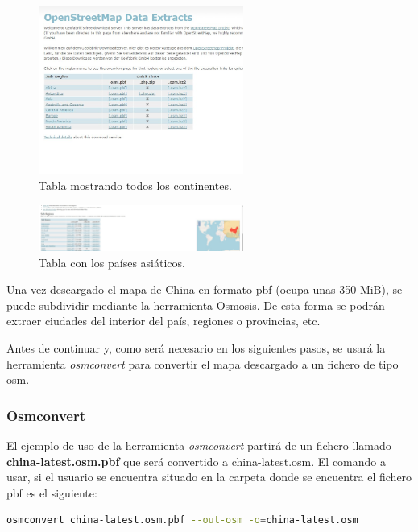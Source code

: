 \begin{figure}[h]
  \centering
    \includegraphics[width=0.6\textwidth]{../img/manualusuario/asia2.jpg}
  \caption{Tabla mostrando todos los continentes.}
  \label{asia2}
\end{figure}

\begin{figure}[h]
  \centering
    \includegraphics[width=0.6\textwidth]{../img/manualusuario/asia3.jpg}
  \caption{Tabla con los países asiáticos.}
  \label{asia3}
\end{figure}


Una vez descargado el mapa de China en formato pbf (ocupa unas 350 MiB), se puede subdividir mediante la herramienta Osmosis. De esta forma se podrán extraer ciudades del interior del país, regiones o provincias, etc.

Antes de continuar y, como será necesario en los siguientes pasos, se usará la herramienta \textit{osmconvert} para convertir el mapa descargado a un fichero de tipo osm.

\subsubsection{Osmconvert}
El ejemplo de uso de la herramienta \textit{osmconvert} partirá de un fichero llamado \textbf{china-latest.osm.pbf} que será convertido a china-latest.osm. El comando a usar, si el usuario se encuentra situado en la carpeta donde se encuentra el fichero pbf es el siguiente:

\begin{lstlisting}[language=bash]
	osmconvert china-latest.osm.pbf --out-osm -o=china-latest.osm
\end{lstlisting}

